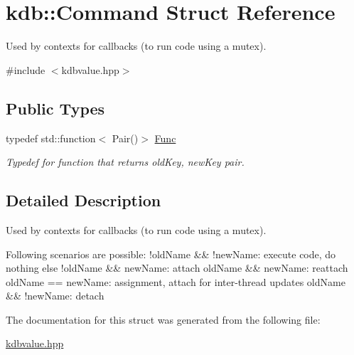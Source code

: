 \hypertarget{structkdb_1_1Command}{}\section{kdb\+::Command Struct Reference}
\label{structkdb_1_1Command}


Used by contexts for callbacks (to run code using a mutex).  




{\ttfamily \#include $<$kdbvalue.\+hpp$>$}

\subsection*{Public Types}
\begin{DoxyCompactItemize}
\item 
\mbox{\label{structkdb_1_1Command_aa49d4f3541e7b5298ae94dfe9c88a67a}} 
typedef std\+::function$<$ Pair()$>$ \mbox{\hyperlink{structkdb_1_1Command_aa49d4f3541e7b5298ae94dfe9c88a67a}{Func}}
\begin{DoxyCompactList}\small\item\em Typedef for function that returns old\+Key, new\+Key pair. \end{DoxyCompactList}\end{DoxyCompactItemize}


\subsection{Detailed Description}
Used by contexts for callbacks (to run code using a mutex). 

Following scenarios are possible\+: !old\+Name \&\& !new\+Name\+: execute code, do nothing else !old\+Name \&\& new\+Name\+: attach old\+Name \&\& new\+Name\+: reattach old\+Name == new\+Name\+: assignment, attach for inter-\/thread updates old\+Name \&\& !new\+Name\+: detach 

The documentation for this struct was generated from the following file\+:\begin{DoxyCompactItemize}
\item 
\mbox{\hyperlink{kdbvalue_8hpp}{kdbvalue.\+hpp}}\end{DoxyCompactItemize}
